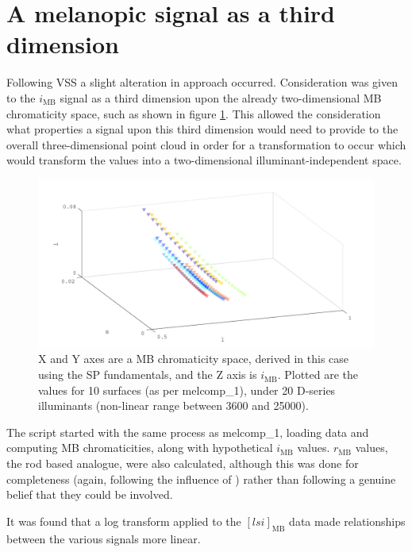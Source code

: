 
\section{A melanopic signal as a third dimension}

Following VSS a slight alteration in approach occurred. Consideration was given to the $i_{\text{MB}}$ signal as a third dimension upon the already two-dimensional \gls{MB} chromaticity space, such as shown in figure \ref{fig:ZL}. This allowed the consideration what properties a signal upon this third dimension would need to provide to the overall three-dimensional point cloud in order for a transformation to occur which would transform the values into a two-dimensional illuminant-independent space.

\begin{figure}[htbp]
 \includegraphics[max width=\textwidth]{figs/comp/melcomp_2/ZL.pdf}
 \caption{X and Y axes are a \gls{MB} chromaticity space, derived in this case using the SP fundamentals, and the Z axis is $i_{\text{MB}}$. Plotted are the values for 10 surfaces (as per melcomp\_1), under 20 D-series illuminants (non-linear range between 3600 and 25000).}
 \label{fig:ZL}
\end{figure} %

The script started with the same process as melcomp\_1, loading data and computing \gls{MB} chromaticities, along with hypothetical $i_{\text{MB}}$ values. $r_{\text{MB}}$ values, the rod based analogue, were also calculated, although this was done for completeness (again, following the influence of \cite{barrionuevo_contributions_2014}) rather than following a genuine belief that they could be involved.



It was found that a log transform applied to the $[lsi]_{\text{MB}}$ data made relationships between the various signals more linear.

